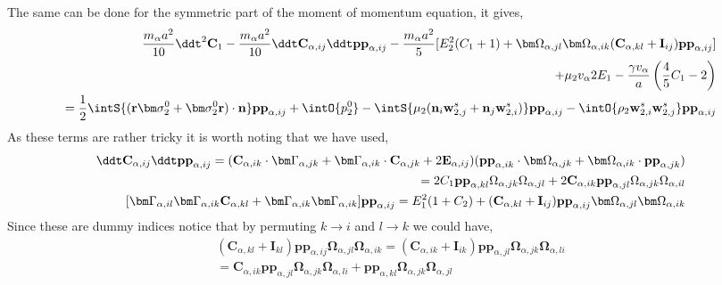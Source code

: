 The same can be done for the symmetric part of the moment of momentum equation, it gives, 
\begin{align*}
    \frac{m_\alpha a^2}{10}\ddt^2 \textbf{C}_1
    - \frac{m_\alpha a^2}{10}\ddt \textbf{C}_{\alpha,ij} \ddt \textbf{pp}_{\alpha,ij}
    - \frac{m_\alpha a^2}{5}[
        E_2^2(C_1 + 1)
        +
        \bm\Omega_{\alpha,jl}\bm\Omega_{\alpha,ik} (\textbf{C}_{\alpha,kl} + \textbf{I}_{ij})\textbf{pp}_{\alpha,ij}
    ] \\
    + \mu_2 v_\alpha 2E_1
    - \frac{ \gamma v_\alpha }{ a} \left(\frac{4}{5}
        C_1
        -2 
    \right)\nonumber\\
    = \frac{1}{2}\intS{(\textbf{r}\bm\sigma_2^0+ \bm\sigma_2^0\textbf{r})\cdot \textbf{n}}\textbf{pp}_{\alpha,ij}
    + \intO{p_2^0 }
    - \intS{\mu_2 (\textbf{n}_i \textbf{w}_{2,j}^s + \textbf{n}_j \textbf{w}_{2,i}^s)}\textbf{pp}_{\alpha,ij}
    - \intO{\rho_2 \textbf{w}_{2,i}^s\textbf{w}_{2,j}^s} \textbf{pp}_{\alpha,ij}
\end{align*}
As these terms are rather tricky it is worth noting that we have used,  
\begin{align*}
    \ddt \textbf{C}_{\alpha,ij} \ddt \textbf{pp}_{\alpha,ij}
    = (\textbf{C}_{\alpha,ik} \cdot \bm\Gamma_{\alpha,jk}
    +  \bm\Gamma_{\alpha,ik} \cdot \textbf{C}_{\alpha,jk}
    +  2\textbf{E}_{\alpha,ij} )
    (\textbf{pp}_{\alpha,ik} \cdot \bm\Omega_{\alpha,jk}
    +  \bm\Omega_{\alpha,ik} \cdot \textbf{pp}_{\alpha,jk})\\
    =
    2 C_1 \textbf{pp}_{\alpha,kl}\Omega_{\alpha,jk}\Omega_{\alpha,jl}
    + 2 \textbf{C}_{\alpha,ik} \textbf{pp}_{\alpha,jl}
    \Omega_{\alpha,jk}\Omega_{\alpha,il}\\
    [ \bm\Gamma_{\alpha,il}\bm\Gamma_{\alpha,ik} \textbf{C}_{\alpha,kl} 
        + \bm\Gamma_{\alpha,ik}\bm\Gamma_{\alpha,ik} ]
    \textbf{pp}_{\alpha,ij}
    =
    E_1^2(1+C_2) + (\textbf{C}_{\alpha,kl} + \textbf{I}_{ij})  \textbf{pp}_{\alpha,ij} \bm\Omega_{\alpha,jl}\bm\Omega_{\alpha,ik}
\end{align*}
Since these are dummy indices notice that by permuting $k\to i$ and $l\to k$ we could have, 
\begin{align*}
    (\textbf{C}_{\alpha,kl} + \textbf{I}_{kl})  \textbf{pp}_{\alpha,ij} \bm\Omega_{\alpha,jl}\bm\Omega_{\alpha,ik}
    = 
    (\textbf{C}_{\alpha,ik} + \textbf{I}_{ik})  
    \textbf{pp}_{\alpha,jl} 
    \bm\Omega_{\alpha,jk}
    \bm\Omega_{\alpha,li}\\
    = 
    \textbf{C}_{\alpha,ik} 
    \textbf{pp}_{\alpha,jl} 
    \bm\Omega_{\alpha,jk}
    \bm\Omega_{\alpha,li}
    + 
    \textbf{pp}_{\alpha,kl} \bm\Omega_{\alpha,jk} \bm\Omega_{\alpha,jl}
    \\
\end{align*}
